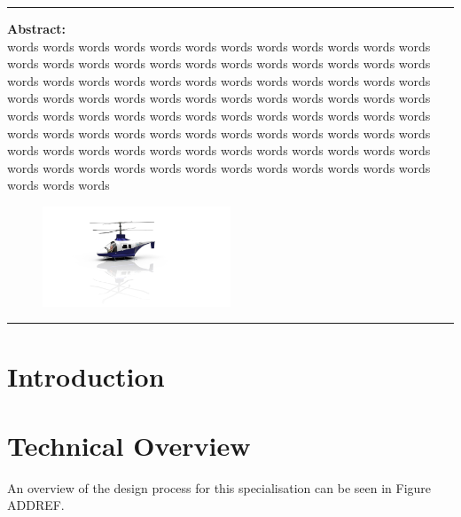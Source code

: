 \documentclass[11pt,a4paper]{article}
\begin{document}
\begin{titlepage}
\hrule
\vspace{10mm}


\textbf{Abstract:}
\\
words words words words words words words words words words words words words words words words words words  words words words words words words words words words  words words words words words words words words words  words words words words words words words words words  words words words words words words words words words  words words words words words words words words words  words words words words words words words words words  words words words words words words words words words  words words words words words words words words words  words words words words words words words words words   

\begin{figure}[H]
    \centering
        \includegraphics[width=0.5\textwidth]{High_res_2.png}
        \end{figure}
\hrule


\vfill
\end{titlepage}
\newpage
\tableofcontents
\thispagestyle{empty}
\newpage
\listoftables
\thispagestyle{empty}
\listoffigures
\thispagestyle{empty}
\newpage
\setcounter{page}{1}


\section{Introduction}

\section{Technical Overview}
An overview of the design process for this specialisation can be seen in  Figure ADDREF.
\end{document}
